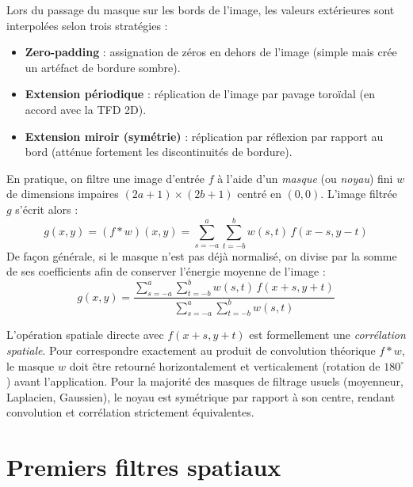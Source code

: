 Lors du passage du masque sur les bords de l'image, les valeurs extérieures sont interpolées selon trois stratégies :
\begin{itemize}
    \item \textbf{Zero-padding} : assignation de zéros en dehors de l'image (simple mais crée un artéfact de bordure sombre).
    \item \textbf{Extension périodique} : réplication de l'image par pavage toroïdal (en accord avec la TFD 2D).
    \item \textbf{Extension miroir (symétrie)} : réplication par réflexion par rapport au bord (atténue fortement les discontinuités de bordure).
\end{itemize}

\begin{definition}
    En pratique, on filtre une image d'entrée $f$ à l'aide d'un \emph{masque} (ou \emph{noyau}) fini $w$ de dimensions impaires $(2a+1) \times (2b+1)$ centré en $(0,0)$. L'image filtrée $g$ s'écrit alors :
    \begin{equation}
        \boxed{g(x,y) = (f * w)(x,y) = \sum_{s=-a}^{a} \sum_{t=-b}^{b} w(s,t) \, f(x - s, y - t)}
    \end{equation}
    De façon générale, si le masque n'est pas déjà normalisé, on divise par la somme de ses coefficients afin de conserver l'énergie moyenne de l'image :
    \begin{equation}
        g(x,y) = \frac{\displaystyle \sum_{s=-a}^{a} \sum_{t=-b}^{b} w(s,t) \, f(x + s, y + t)}{\displaystyle \sum_{s=-a}^{a} \sum_{t=-b}^{b} w(s,t)}
    \end{equation}
\end{definition}

\begin{remark}
    L'opération spatiale directe avec $f(x+s, y+t)$ est formellement une \emph{corrélation spatiale}. Pour correspondre exactement au produit de convolution théorique $f * w$, le masque $w$ doit être retourné horizontalement et verticalement (rotation de $180^\circ$) avant l'application. Pour la majorité des masques de filtrage usuels (moyenneur, Laplacien, Gaussien), le noyau est symétrique par rapport à son centre, rendant convolution et corrélation strictement équivalentes.
\end{remark}



\section{Premiers filtres spatiaux}


